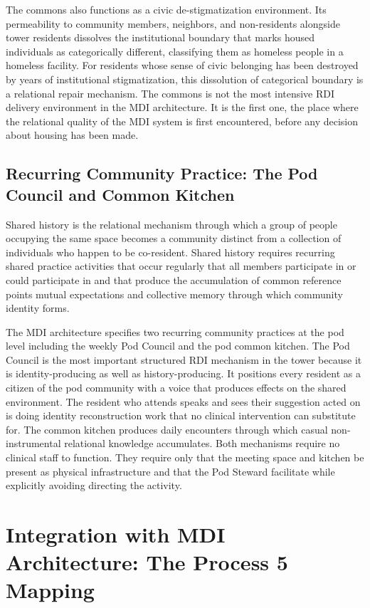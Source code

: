 \documentclass[12pt, letterpaper]{article}
\begin{document}
The commons also functions as a civic de-stigmatization environment. Its permeability to community members, neighbors, and non-residents alongside tower residents dissolves the institutional boundary that marks housed individuals as categorically different, classifying them as homeless people in a homeless facility. For residents whose sense of civic belonging has been destroyed by years of institutional stigmatization, this dissolution of categorical boundary is a relational repair mechanism. The commons is not the most intensive RDI delivery environment in the MDI architecture. It is the first one, the place where the relational quality of the MDI system is first encountered, before any decision about housing has been made.

\subsection{Recurring Community Practice: The Pod Council and Common Kitchen}

Shared history is the relational mechanism through which a group of people occupying the same space becomes a community distinct from a collection of individuals who happen to be co-resident. Shared history requires recurring shared practice activities that occur regularly that all members participate in or could participate in and that produce the accumulation of common reference points mutual expectations and collective memory through which community identity forms.

The MDI architecture specifies two recurring community practices at the pod level including the weekly Pod Council and the pod common kitchen. The Pod Council is the most important structured RDI mechanism in the tower because it is identity-producing as well as history-producing. It positions every resident as a citizen of the pod community with a voice that produces effects on the shared environment. The resident who attends speaks and sees their suggestion acted on is doing identity reconstruction work that no clinical intervention can substitute for. The common kitchen produces daily encounters through which casual non-instrumental relational knowledge accumulates. Both mechanisms require no clinical staff to function. They require only that the meeting space and kitchen be present as physical infrastructure and that the Pod Steward facilitate while explicitly avoiding directing the activity.


\clearpage
\section{Integration with MDI Architecture: The Process 5 Mapping}
\end{document}
